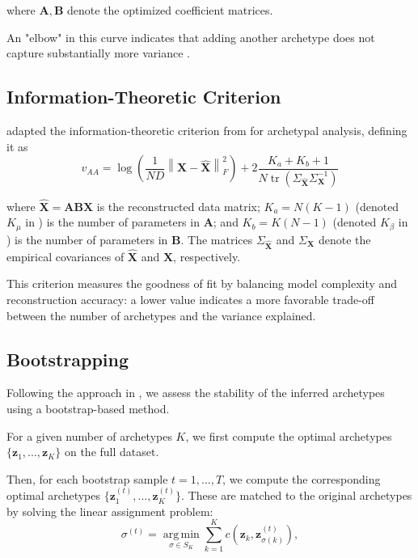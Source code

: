 \documentclass{article}
\DeclareMathOperator*{\argmin}{arg\,min}
\begin{document}
where $\mathbf{A}, \mathbf{B}$ denote the optimized coefficient matrices.

An "elbow" in this curve indicates that adding another archetype does not capture substantially more variance \autocite{cutlerArchetypalAnalysis1994,morupArchetypalAnalysisMachine2012, eugsterSpiderManHeroArchetypal2009}.

\subsection{Information-Theoretic Criterion}

\textcite{sulemanValidationArchetypalAnalysis2017} adapted the information-theoretic criterion from \textcite{sulemanMeasuringCongruenceFuzzy2017} for archetypal analysis, defining it as
\begin{equation}
    v_{AA} =
    \log \left( \frac{1}{N D} \left\| \mathbf{X} - \hat{\mathbf{X}} \right\|_F^2 \right)
    + 2 \frac{K_a + K_b + 1}{N \operatorname{tr}\left( \Sigma_{\hat{\mathbf{X}}} \Sigma_{\mathbf{X}}^{-1}\right)}
\end{equation}

where $\hat{\mathbf{X}} = \mathbf{A} \mathbf{B} \mathbf{X}$ is the reconstructed data matrix; $K_{a} = N (K-1)$ (denoted $K_\mu$ in \autocite{sulemanValidationArchetypalAnalysis2017}) is the number of parameters in $\mathbf{A}$; and $K_{b} = K (N-1)$ (denoted $K_\beta$ in \autocite{sulemanValidationArchetypalAnalysis2017}) is the number of parameters in $\mathbf{B}$. The matrices $\Sigma_{\hat{\mathbf{X}}}$ and $\Sigma_{\mathbf{X}}$ denote the empirical covariances of $\hat{\mathbf{X}}$ and $\mathbf{X}$, respectively.

This criterion measures the goodness of fit by balancing model complexity and reconstruction accuracy: a lower value indicates a more favorable trade-off between the number of archetypes and the variance explained.

\subsection{Bootstrapping}

Following the approach in \autocite{Hart2015, Korem2015}, we assess the stability of the inferred archetypes using a bootstrap-based method.

For a given number of archetypes $K$, we first compute the optimal archetypes $\{ \mathbf{z}_1, ..., \mathbf{z}_K \}$ on the full dataset.

Then, for each bootstrap sample $t = 1, ..., T$, we compute the corresponding optimal archetypes $\{ \mathbf{z}_1^{(t)}, ..., \mathbf{z}_K^{(t)} \}$. These are matched to the original archetypes by solving the linear assignment problem:
\begin{equation}
    \sigma^{(t)} = \underset{\sigma \in S_K}{\argmin} \sum_{k=1}^K c\left( \mathbf{z}_k, \mathbf{z}_{\sigma(k)}^{(t)} \right),
\end{equation}
\end{document}
